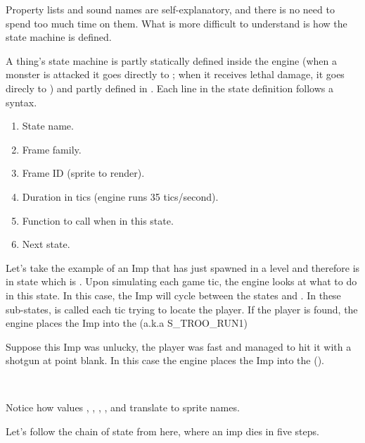 Property lists and sound names are self-explanatory, and there is no need to spend too much time on them. What is more difficult to understand is how the state machine is defined.\\
\par
A thing's state machine is partly statically defined inside the engine (when a monster is attacked it goes directly to ; when it receives lethal damage, it goes direcly to ) and partly defined in . Each line in the state definition follows a syntax.
\begin{enumerate}
\item State name.
\item Frame family.
\item Frame ID (sprite to render).
\item Duration in tics (engine runs 35 tics/second).
\item Function to call when in this state.
\item Next state.
\end{enumerate}
\par
Let's take the example of an Imp that has just spawned in a level and therefore is in state  which is . Upon simulating each game tic, the engine looks at what to do in this state. In this case, the Imp will cycle between the states  and . In these sub-states,  is called each tic trying to locate the player. If the player is found, the engine places the Imp into the  (a.k.a S\_TROO\_RUN1)\\
\par

Suppose this Imp was unlucky, the player was fast and managed to hit it with a shotgun at point blank. In this case the engine places the Imp into the  ().\\
\par
{}\\
\par
Notice how values , , , , and  translate to sprite names.\\
\par
{}
Let's follow the chain of state from here, where an imp dies in five steps.

